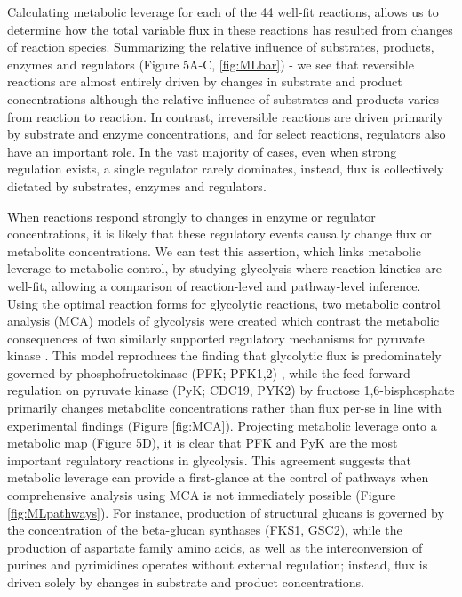 Calculating metabolic leverage for each of the 44 well-fit reactions, allows us to determine how the total variable flux in these reactions has resulted from changes of reaction species.  Summarizing the relative influence of substrates, products, enzymes and regulators (Figure 5A-C, \ref{fig:MLbar}) - we see that reversible reactions are almost entirely driven by changes in substrate and product concentrations although the relative influence of substrates and products varies from reaction to reaction.  In contrast, irreversible reactions are driven primarily by substrate and enzyme concentrations, and for select reactions, regulators also have an important role. In the vast majority of cases, even when strong regulation exists, a single regulator rarely dominates, instead, flux is collectively dictated by substrates, enzymes and regulators.

When reactions respond strongly to changes in enzyme or regulator concentrations, it is likely that these regulatory events causally change flux or metabolite concentrations.  We can test this assertion, which links metabolic leverage to metabolic control, by studying glycolysis where reaction kinetics are well-fit, allowing a comparison of reaction-level and pathway-level inference.  Using the optimal reaction forms for glycolytic reactions, two metabolic control analysis (MCA) models of glycolysis were created which contrast the metabolic consequences of two similarly supported regulatory mechanisms for pyruvate kinase \cite{Cortassa:1994is, Westerhoff:1987jo}. This model reproduces the finding that glycolytic flux is predominately governed by phosphofructokinase (PFK; PFK1,2) \cite{Cortassa:1994is}, while the feed-forward regulation on pyruvate kinase (PyK; CDC19, PYK2) by fructose 1,6-bisphosphate primarily changes metabolite concentrations rather than flux per-se in line with experimental findings\cite{Xu:2012gg} (Figure \ref{fig:MCA}). Projecting metabolic leverage onto a metabolic map (Figure 5D), it is clear that PFK and PyK are the most important regulatory reactions in glycolysis.  This agreement suggests that metabolic leverage can provide a first-glance at the control of pathways when comprehensive analysis using MCA is not immediately possible (Figure \ref{fig:MLpathways}).  For instance, production of structural glucans is governed by the concentration of the beta-glucan synthases (FKS1, GSC2), while the production of aspartate family amino acids, as well as the interconversion of purines and pyrimidines operates without external regulation; instead, flux is driven solely by changes in substrate and product concentrations. 

